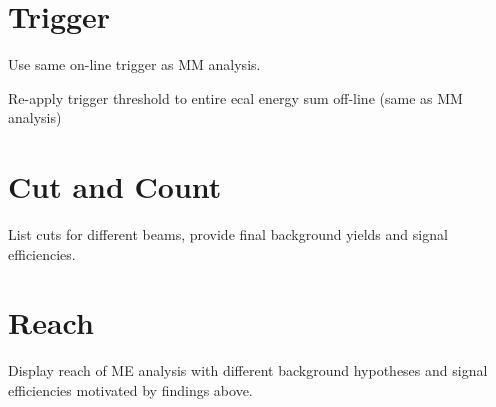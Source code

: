 \section{Trigger}
Use same on-line trigger as MM analysis.

Re-apply trigger threshold to entire ecal energy sum off-line (same as MM analysis)

\section{Cut and Count}
List cuts for different beams, provide final background yields and signal efficiencies.

\section{Reach}
Display reach of ME analysis with different background hypotheses and signal efficiencies
motivated by findings above.

